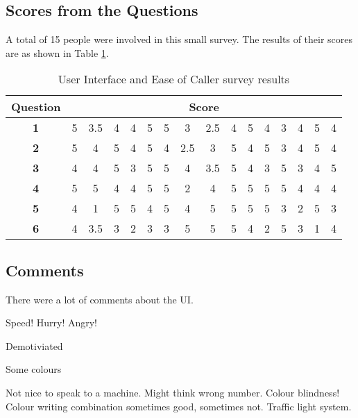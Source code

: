 \documentclass[main.tex]{subfiles}
\begin{document}
\subsection{Scores from the Questions}
A total of 15 people were involved in this small survey. The results of their scores are as shown in Table \ref{tbl:survey}.

\begin{table}[h]
\centering
\begin{tabular}{|c|ccccccccccccccc|}
	\hline
\textbf{Question} & \multicolumn{15}{|c|}{\textbf{Score}} \\\hline
\textbf{1} & 5 & 3.5 & 4 & 4 & 5 & 5 & 3 & 2.5 & 4 & 5 & 4 & 3 & 4 & 5 & 4 \\
\textbf{2} & 5 & 4 & 5 & 4 & 5 & 4 & 2.5 & 3 & 5 & 4 & 5 & 3 & 4 & 5 & 4 \\
\textbf{3} & 4 & 4 & 5 & 3 & 5 & 5 & 4 & 3.5 & 5 & 4 & 3 & 5 & 3 & 4 & 5 \\
\textbf{4} & 5 & 5 & 4 & 4 & 5 & 5 & 2 & 4 & 5 & 5 & 5 & 5 & 4 & 4 & 4 \\
\textbf{5} & 4 & 1 & 5 & 5 & 4 & 5 & 4 & 5 & 5 & 5 & 5 & 3 & 2 & 5 & 3 \\
\textbf{6} & 4 & 3.5 & 3 & 2 & 3 & 3 & 5 & 5 & 5 & 4 & 2 & 5 & 3 & 1 & 4\\\hline
\end{tabular}
\caption{User Interface and Ease of Caller survey results}
\label{tbl:survey}
\end{table}

\subsection{Comments}
There were a lot of comments about the UI.

Speed!
Hurry!
Angry!

Demotiviated

Some colours

Not nice to speak to a machine. Might think wrong number. Colour blindness! Colour writing combination sometimes good, sometimes not. Traffic light system.
\end{document}
